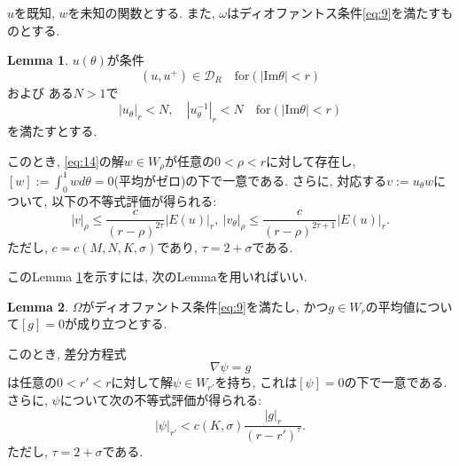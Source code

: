 \documentclass[a4paper]{ujarticle}
\numberwithin{equation}{section}
\theoremstyle{definition}
\newtheorem{lemma}{Lemma}
\begin{document}
        $u$を既知, $w$を未知の関数とする. また, $\omega$はディオファントス条件\eqref{eq:9}を満たすものとする.
        \begin{lemma} \label{lem:8}
            $u(\theta)$が条件
            \begin{equation} \label{eq:16}
                (u, u^{+}) \in \mathcal{D}_{R} \quad \text{for} (|\mathrm{Im} \theta| < r)
            \end{equation}
            および ある$N > 1$で
            \begin{equation} \label{eq:17}
                |u_{\theta}|_r < N, \quad |u^{-1}_{\theta}|_r < N \quad \text{for} (|\mathrm{Im} \theta| < r)
            \end{equation}
            を満たすとする. 
            
            このとき, \eqref{eq:14}の解$w \in W_{\rho}$が任意の$0 < \rho < r$に対して存在し, $\displaystyle [w] := \int^{1}_{0} w d \theta = 0$(平均がゼロ)の下で一意である.
            さらに, 対応する$v := u_{\theta} w$について, 以下の不等式評価が得られる:
            \begin{equation} \label{eq:18}
                |v|_{\rho} \leq \frac{c}{(r - \rho)^{2 \tau}} |E(u)|_{r}, \ |v_{\theta}|_{\rho} \leq \frac{c}{(r - \rho)^{2 \tau + 1}} |E(u)|_{r}.
            \end{equation}
            ただし, $c = c(M ,N, K, \sigma)$であり, $\tau = 2 + \sigma$である.
        \end{lemma}

        このLemma \ref{lem:8}を示すには, 次のLemmaを用いればいい.
        \begin{lemma} \label{lem:9}
            $\Omega$がディオファントス条件\eqref{eq:9}を満たし, かつ$g \in W_r$の平均値について$[g] = 0$が成り立つとする.

            このとき, 差分方程式
            \begin{equation} \label{eq:19}
                \nabla \psi = g
            \end{equation}
            は任意の$0 < r' < r$に対して解$\psi \in W_{r'}$を持ち, これは$[\psi] = 0$の下で一意である.
            さらに, $\psi$について次の不等式評価が得られる:
            \begin{equation} \label{eq:20}
                |\psi|_{r'} < c(K, \sigma) \frac{|g|_{r}}{(r - r')^{\tau}}.
            \end{equation}
            ただし, $\tau = 2 + \sigma$である.
        \end{lemma}
\end{document}
